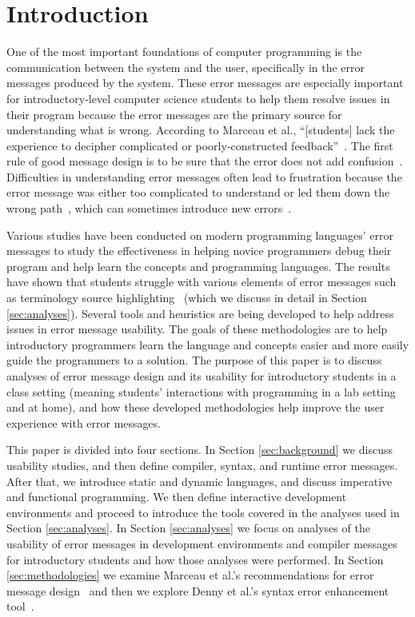 \documentclass{sig-alternate}
\begin{document}
\section{Introduction}\label{sec:intro}
One of the most important foundations of computer programming is the communication between the system and the user, specifically in the error messages produced by the system.
These error messages are especially important for introductory-level computer science students to help them resolve issues in their program because the error messages are the primary source for understanding what is wrong.
According to Marceau et al., ``[students] lack the experience to decipher complicated or poorly-constructed feedback''~\cite{Marceau:2011:MEE:1953163.1953308}.
The first rule of good message design is to be sure that the error does not add confusion~\cite{Isa:1983:MOE:800045.801583}.
Difficulties in understanding error messages often lead to frustration because the error message was either too complicated to understand or led them down the wrong path~\cite{Marceau:2011:MYL:2048237.2048241}, which can sometimes introduce new errors~\cite{Denny:2014:ESE:2591708.2591748}.

Various studies have been conducted on modern programming languages' error messages to study the effectiveness in helping novice programmers debug their program and help learn the concepts and programming languages.
The results have shown that students struggle with various elements of error messages such as terminology source highlighting~\cite{Denny:2014:ESE:2591708.2591748,Traver:2010} (which we discuss in detail in Section \ref{sec:analyses}).
Several tools and heuristics are being developed to help address issues in error message usability.
The goals of these methodologies are to help introductory programmers learn the language and concepts easier and more easily guide the programmers to a solution.
The purpose of this paper is to discuss analyses of error message design and its usability for introductory students in a class setting (meaning students' interactions with programming in a lab setting and at home), and how these developed methodologies help improve the user experience with error messages. 

This paper is divided into four sections.
In Section \ref{sec:background} we discuss usability studies, and then define compiler, syntax, and runtime error messages. After that, we introduce static and dynamic languages, and discuss imperative and functional programming. We then define interactive development environments and proceed to introduce the tools covered in the analyses used in Section \ref{sec:analyses}.
In Section \ref{sec:analyses} we focus on analyses of the usability of error messages in development environments and compiler messages for introductory students and how those analyses were performed.
In Section \ref{sec:methodologies} we examine Marceau et al.'s recommendations for error message design~\cite{Marceau:2011:MYL:2048237.2048241} and then we explore Denny et al.'s syntax error enhancement tool~\cite{Denny:2014:ESE:2591708.2591748}.
\end{document}
